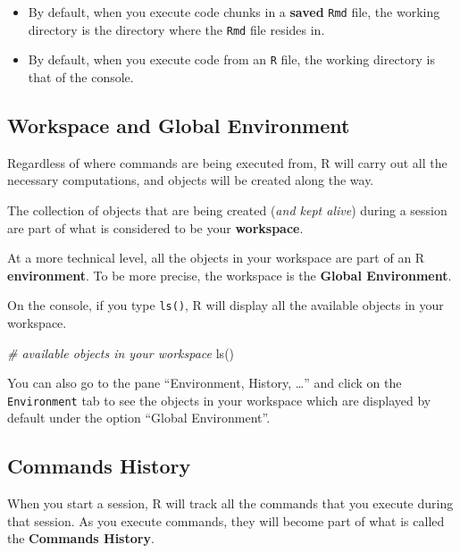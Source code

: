 \documentclass[
]{book}
\newenvironment{Shaded}{\begin{snugshade}}{\end{snugshade}}
\newcommand{\CommentTok}[1]{\textcolor[rgb]{0.56,0.35,0.01}{\textit{#1}}}
\newcommand{\FunctionTok}[1]{\textcolor[rgb]{0.00,0.00,0.00}{#1}}
\newcommand{\NormalTok}[1]{#1}
\begin{document}
\begin{itemize}
\item
  By default, when you execute code chunks in a \textbf{saved} \texttt{Rmd} file, the
  working directory is the directory where the \texttt{Rmd} file resides in.
\item
  By default, when you execute code from an \texttt{R} file, the working directory
  is that of the console.
\end{itemize}

\hypertarget{workspace-and-global-environment}{%
\subsection{Workspace and Global Environment}\label{workspace-and-global-environment}}

Regardless of where commands are being executed from, R will carry out
all the necessary computations, and objects will be created along the way.

The collection of objects that are being created (\emph{and kept alive}) during a
session are part of what is considered to be your \textbf{workspace}.

At a more technical level, all the objects in your workspace are part of an R
\textbf{environment}. To be more precise, the workspace is the \textbf{Global Environment}.

On the console, if you type \texttt{ls()}, R will display all the available objects
in your workspace.

\begin{Shaded}
\begin{Highlighting}[]
\CommentTok{\# available objects in your workspace}
\FunctionTok{ls}\NormalTok{()}
\end{Highlighting}
\end{Shaded}

You can also go to the pane ``Environment, History, \ldots{}'' and
click on the \texttt{Environment} tab to see the objects in your workspace which are
displayed by default under the option ``Global Environment''.

\hypertarget{commands-history}{%
\subsection{Commands History}\label{commands-history}}

When you start a session, R will track all the commands that you execute during
that session. As you execute commands, they will become part of what is called
the \textbf{Commands History}.
\end{document}
